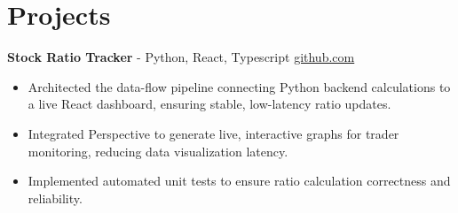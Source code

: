 \documentclass[11pt]{article}       %
\begin{document}

\vspace{-18.5pt}

\section*{Projects}

\textbf{Stock Ratio Tracker}{ - Python, React, Typescript} \hfill \href{https://github.com/Monica20030707/tradingDashboard-UI}{github.com} \\
\vspace{-9pt}
\begin{itemize}
  \item Architected the data-flow pipeline connecting Python backend calculations to a live React dashboard, ensuring stable, low-latency ratio updates. 
  \item Integrated Perspective to generate live, interactive graphs for trader monitoring, reducing data visualization latency.
  \item Implemented automated unit tests to ensure ratio calculation correctness and reliability.
\end{itemize}

\end{document}
